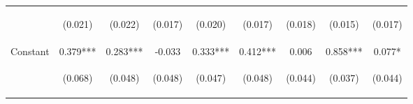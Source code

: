\begin{center}
\begin{tabular}{lcccccccc}
\vspace{4pt} & \begin{footnotesize}(0.021)\end{footnotesize} & \begin{footnotesize}(0.022)\end{footnotesize} & \begin{footnotesize}(0.017)\end{footnotesize} & \begin{footnotesize}(0.020)\end{footnotesize} & \begin{footnotesize}(0.017)\end{footnotesize} & \begin{footnotesize}(0.018)\end{footnotesize} & \begin{footnotesize}(0.015)\end{footnotesize} & \begin{footnotesize}(0.017)\end{footnotesize} \\
Constant & 0.379*** & 0.283*** & -0.033 & 0.333*** & 0.412*** & 0.006 & 0.858*** & 0.077* \\
 & \begin{footnotesize}(0.068)\end{footnotesize} & \begin{footnotesize}(0.048)\end{footnotesize} & \begin{footnotesize}(0.048)\end{footnotesize} & \begin{footnotesize}(0.047)\end{footnotesize} & \begin{footnotesize}(0.048)\end{footnotesize} & \begin{footnotesize}(0.044)\end{footnotesize} & \begin{footnotesize}(0.037)\end{footnotesize} & \begin{footnotesize}(0.044)\end{footnotesize} \\

\end{tabular}
\end{center}
